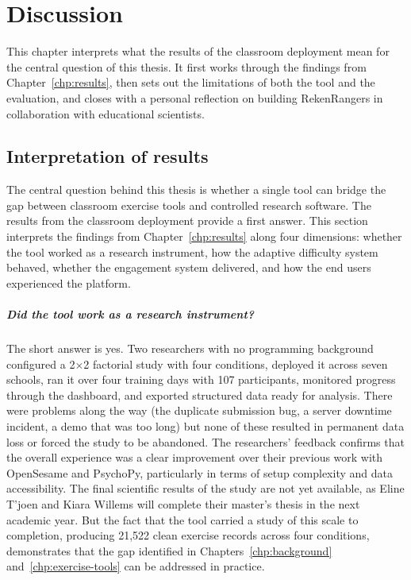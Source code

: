 \chapter{Discussion}
\label{chp:discussion}

This chapter interprets what the results of the classroom deployment mean for the central question of this thesis. It first works through the findings from Chapter~\ref{chp:results}, then sets out the limitations of both the tool and the evaluation, and closes with a personal reflection on building RekenRangers in collaboration with educational scientists.

\section{Interpretation of results}
\label{sec:interpretation-of-results}
The central question behind this thesis is whether a single tool can bridge the gap between classroom exercise tools and controlled research software. The results from the classroom deployment provide a first answer. This section interprets the findings from Chapter~\ref{chp:results} along four dimensions: whether the tool worked as a research instrument, how the adaptive difficulty system behaved, whether the engagement system delivered, and how the end users experienced the platform.

\paragraph{Did the tool work as a research instrument?}
The short answer is yes. Two researchers with no programming background configured a 2$\times$2 factorial study with four conditions, deployed it across seven schools, ran it over four training days with 107 participants, monitored progress through the dashboard, and exported structured data ready for analysis. There were problems along the way (the duplicate submission bug, a server downtime incident, a demo that was too long) but none of these resulted in permanent data loss or forced the study to be abandoned. The researchers' feedback confirms that the overall experience was a clear improvement over their previous work with OpenSesame and PsychoPy, particularly in terms of setup complexity and data accessibility. The final scientific results of the study are not yet available, as Eline T'joen and Kiara Willems will complete their master's thesis in the next academic year. But the fact that the tool carried a study of this scale to completion, producing 21,522 clean exercise records across four conditions, demonstrates that the gap identified in Chapters~\ref{chp:background} and~\ref{chp:exercise-tools} can be addressed in practice.

